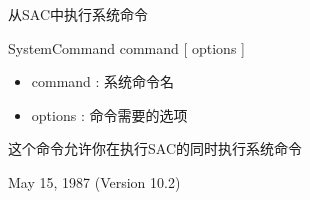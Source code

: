 \label{cmd:systemcommand}

从SAC中执行系统命令

SystemCommand command [ options ]

\begin{itemize}
\item command : 系统命令名 
\item options : 命令需要的选项 
\end{itemize}

这个命令允许你在执行SAC的同时执行系统命令

May 15, 1987 (Version 10.2)
